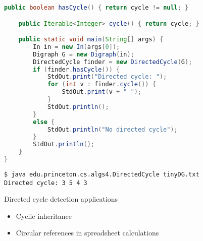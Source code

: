 \documentclass[8pt,a4paper,compress]{beamer}
\begin{document}
\begin{frame}[fragile]
\pause

\begin{lstlisting}[language=java,style=focusin]
    public boolean hasCycle() { return cycle != null; }

    public Iterable<Integer> cycle() { return cycle; }

    public static void main(String[] args) {
        In in = new In(args[0]);
        Digraph G = new Digraph(in);
        DirectedCycle finder = new DirectedCycle(G);
        if (finder.hasCycle()) {
            StdOut.print("Directed cycle: ");
            for (int v : finder.cycle()) { 
                StdOut.print(v + " "); 
            }
            StdOut.println();
        }
        else {
            StdOut.println("No directed cycle");
        }
        StdOut.println();
    }
}
\end{lstlisting}

\pause

\begin{lstlisting}[language={},style=focusin]
$ java edu.princeton.cs.algs4.DirectedCycle tinyDG.txt 
Directed cycle: 3 5 4 3 
\end{lstlisting}

\pause
\bigskip

Directed cycle detection applications
\begin{itemize}
\item Cyclic inheritance

\item Circular references in spreadsheet calculations
\end{itemize}
\end{frame}
\end{document}

